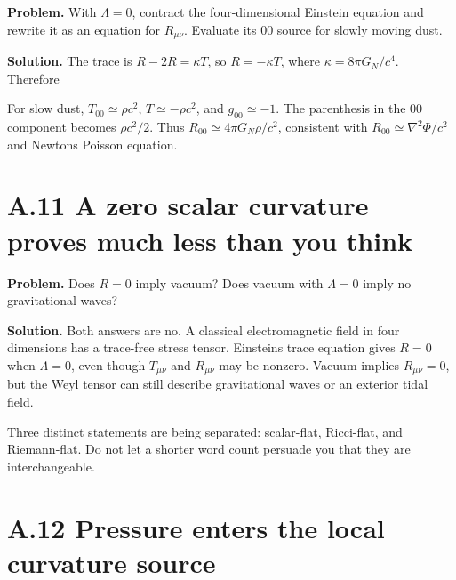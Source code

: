 \documentclass[
  11pt,
  letterpaper,
  oneside,
  openany]{scrbook}
\begin{document}
\textbf{Problem.} With \(\Lambda=0\), contract the four-dimensional
Einstein equation and rewrite it as an equation for \(R_{\mu\nu}\).
Evaluate its \(00\) source for slowly moving dust.

\textbf{Solution.} The trace is \(R-2R=\kappa T\), so \(R=-\kappa T\),
where \(\kappa=8\pi G_N/c^4\). Therefore

\begin{center}
\begingroup
{}
\ifdim\wd\grmathbox>\linewidth
\resizebox{\linewidth}{!}{\usebox{\grmathbox}}
\else\usebox{\grmathbox}\fi
\endgroup
\end{center}

For slow dust, \(T_{00}\simeq\rho c^2\), \(T\simeq-\rho c^2\), and
\(g_{00}\simeq-1\). The parenthesis in the \(00\) component becomes
\(\rho c^2/2\). Thus \(R_{00}\simeq4\pi G_N\rho/c^2\), consistent with
\(R_{00}\simeq\nabla^2\Phi/c^2\) and Newton\textquotesingle s Poisson
equation.

\hypertarget{a.11-a-zero-scalar-curvature-proves-much-less-than-you-think}{%
\section{A.11 A zero scalar curvature proves much less than you
think}\label{a.11-a-zero-scalar-curvature-proves-much-less-than-you-think}}

\textbf{Problem.} Does \(R=0\) imply vacuum? Does vacuum with
\(\Lambda=0\) imply no gravitational waves?

\textbf{Solution.} Both answers are no. A classical electromagnetic
field in four dimensions has a trace-free stress tensor.
Einstein\textquotesingle s trace equation gives \(R=0\) when
\(\Lambda=0\), even though \(T_{\mu\nu}\) and \(R_{\mu\nu}\) may be
nonzero. Vacuum implies \(R_{\mu\nu}=0\), but the Weyl tensor can still
describe gravitational waves or an exterior tidal field.

Three distinct statements are being separated: scalar-flat, Ricci-flat,
and Riemann-flat. Do not let a shorter word count persuade you that they
are interchangeable.

\hypertarget{a.12-pressure-enters-the-local-curvature-source}{%
\section{A.12 Pressure enters the local curvature
source}\label{a.12-pressure-enters-the-local-curvature-source}}
\end{document}
